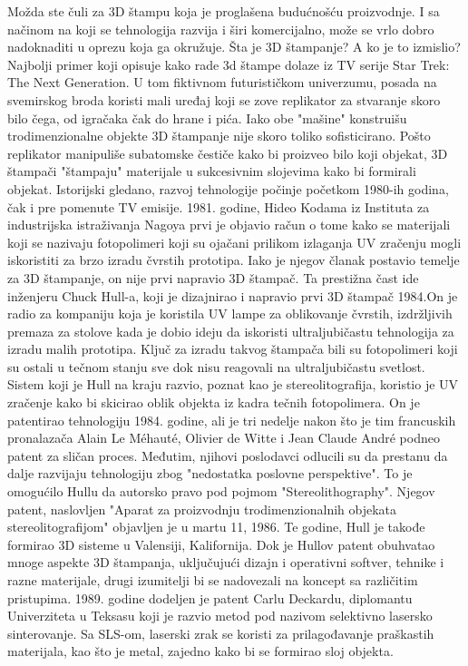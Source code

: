 \documentclass[a4paper]{article}
\begin{document}
{\bigbreak Možda ste čuli za 3D štampu koja je proglašena budućnošću proizvodnje. I sa načinom na koji se tehnologija razvija i širi komercijalno, može se vrlo dobro nadoknaditi u oprezu koja ga okružuje. Šta je 3D štampanje? A ko je to izmislio? 
\bigbreak Najbolji primer koji opisuje kako rade 3d štampe dolaze iz TV serije Star Trek: The Next Generation. U tom fiktivnom futurističkom univerzumu, posada na svemirskog broda koristi mali uređaj koji se zove replikator za stvaranje skoro bilo čega, od igračaka čak do hrane i pića. 
\bigbreak Iako obe "mašine" konstruišu trodimenzionalne objekte 3D štampanje nije skoro toliko sofisticirano. Pošto replikator manipuliše subatomske čestiče kako bi proizveo bilo koji objekat, 3D štampači "štampaju" materijale u sukcesivnim slojevima kako bi formirali objekat.  
\bigbreak Istorijski gledano, razvoj tehnologije počinje početkom 1980-ih godina, čak i pre pomenute TV emisije. 1981. godine, Hideo Kodama iz Instituta za industrijska istraživanja Nagoya prvi je objavio račun o tome kako se materijali koji se nazivaju fotopolimeri koji su ojačani prilikom izlaganja UV zračenju mogli iskoristiti za brzo izradu čvrstih prototipa. Iako je njegov članak postavio temelje za 3D štampanje, on nije prvi napravio 3D štampač. 
\bigbreak Ta prestižna čast ide inženjeru Chuck Hull-a, koji je dizajnirao i napravio prvi 3D štampač 1984.On je radio za kompaniju koja je koristila UV lampe za oblikovanje čvrstih, izdržljivih premaza za stolove kada je dobio ideju da iskoristi ultraljubičastu tehnologija za izradu malih prototipa. 
\bigbreak Ključ za izradu takvog štampača bili su fotopolimeri koji su ostali u tečnom stanju sve dok nisu reagovali na ultraljubičastu svetlost. Sistem koji je Hull na kraju razvio, poznat kao je stereolitografija, koristio je UV zračenje kako bi skicirao oblik objekta iz kadra tečnih fotopolimera. 
\bigbreak On je patentirao tehnologiju 1984. godine, ali je tri nedelje nakon što je tim francuskih pronalazača Alain Le Méhauté, Olivier de Witte i Jean Claude André podneo patent za sličan proces. Međutim, njihovi poslodavci odlucili su da prestanu da dalje razvijaju tehnologiju zbog "nedostatka poslovne perspektive". To je omogućilo Hullu da autorsko pravo pod pojmom "Stereolithography". Njegov patent, naslovljen "Aparat za proizvodnju trodimenzionalnih objekata stereolitografijom" objavljen je u martu 11, 1986. Te godine, Hull je takođe formirao 3D sisteme u Valensiji, Kalifornija.
Dok je Hullov patent obuhvatao mnoge aspekte 3D štampanja, uključujući dizajn i operativni softver, tehnike i razne materijale, drugi izumitelji bi se nadovezali na koncept sa različitim pristupima. 1989. godine dodeljen je patent Carlu Deckardu, diplomantu Univerziteta u Teksasu koji je razvio metod pod nazivom selektivno lasersko sinterovanje. Sa SLS-om, laserski zrak se koristi za prilagođavanje praškastih materijala, kao što je metal, zajedno kako bi se formirao sloj objekta. 
}
\end{document}
